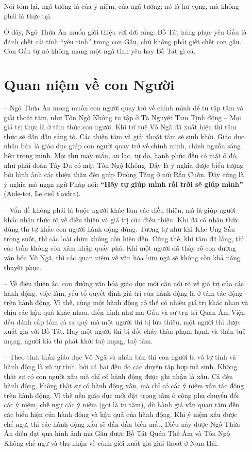 Nói tóm lại, ngã tướng là của ý niệm, của ngã tưởng; nó là hư vọng, mà không phải là thực tại.

Ở đây, Ngô Thừa Ân muốn giới thiệu với đời rằng: Bồ Tát hàng phục yêu Gấu là đánh chết cái tính ``yêu tinh'' trong con Gấu, chứ không phải giết chết con gấu. Con Gấu tự nó không mang một ngã tính yêu hay Bồ Tát gì cả.


\section{Quan niệm về con Người} %
\label{sec:15_con_nguoi}

-- Ngô Thừa Ân mong muốn con người quay trở về chính mình để tu tập tâm và giải thoát tâm, như Tôn Ngộ Không tu tập ở Tà Nguyệt Tam Tịnh động -- Mọi giá trị thực là ở tâm thức con người. Khi trí tuệ Vô Ngã đã xuất hiện thì tâm thức sẽ dần dần sáng tỏ. Các thiện tâm và giải thoát tâm sẽ sinh khởi. Giáo dục nhân bản là giáo dục giúp con người quay trở về chính minh, chính nguồn sáng bên trong mình. Mọi thứ may mắn, an lạc, tự do, hạnh phúc đều có mặt ở đó, như phái đoàn Tây Du có mặt Tôn Ngộ Không. Đây là ý nghĩa được biểu tượng bởi hình ảnh các thiện thần đến giúp Đường Tăng ở núi Rắn Cuốn. Đây cũng là ý nghĩa mà ngạn ngữ Pháp nói: {\bf ``Hãy tự giúp mình rồi trời sẽ giúp mình''} (Aide-toi, Le ciel t'aidra).

-- Vấn đề không phải là buộc người khác làm các điều thiện, mà là giúp người khác nhận thức rõ về điều thiện và giá trị của điều thiện. Khi đã có nhận thức đúng thì tự khắc con người hành động đúng. Tương tự như khi Khe Ưng Sầu trong suốt, thì các loài chim không còn hiện đến. Cũng thế, khi tâm đã lắng, thì các trần không còn xâm nhập quấy phá. Khi một người đã thấy rõ con đường văn hóa Vô Ngã, thì các quan niệm về văn hóa hữu ngã sẽ không còn khả năng thuyết phục.

-- Về điều thiện ác, con đường văn hóa giáo dục mới cần nói rõ về giá trị của các hành động, việc làm, yếu tố quyết định giá trị của hành động là ở tâm tác động trên hành động. Vì thế, cùng một hành động có thể có nhiều giá trị khác nhau và chịu các hậu quả khác nhau, điển hình như ma Gấu và sư trụ trì Quan Âm Viện đều đánh cắp tấm cà sa quý mà một người thì bị lửa thiêu, một người thì được xuất gia với Bồ Tát. Hay một người thì bị đốt cháy thân phạm hạnh và thân tuệ mạng, người kia thì phát khởi tuệ mạng, tuệ tâm.

-- Theo tinh thần giáo dục Vô Ngã và nhân bản thì con người là vô tự tính và hành động là vô tự tính, bởi cả hai đều do các duyên tập hợp mà sinh. Không thật sự có con người xấu mà chỉ có hành động được ghi nhận là xấu. Cả đến hành động, không thật sự có hành động xấu, mà chỉ có các ý niệm xấu tác động trên hành động. Vì thế nền giáo dục mới đặt trọng tâm ở công phu chuyển đổi các ý niệm, chế ngự các ý niệm (gọi là tu tâm), dù hành giả vẫn quan tâm đến các biểu hiện của hành động và hậu quả của hành động. Khi ý niệm xấu được chế ngự, thì các hành động xấu sẽ dần dần biến mất. Điều này được Ngô Thừa Ân diễn đạt qua hình ảnh ma Gấu được Bồ Tát Quán Thế Âm và Tôn Ngộ Không chế ngự và thu nhận về cảnh giới xuất gia giải thoát ở Nam Hải.

